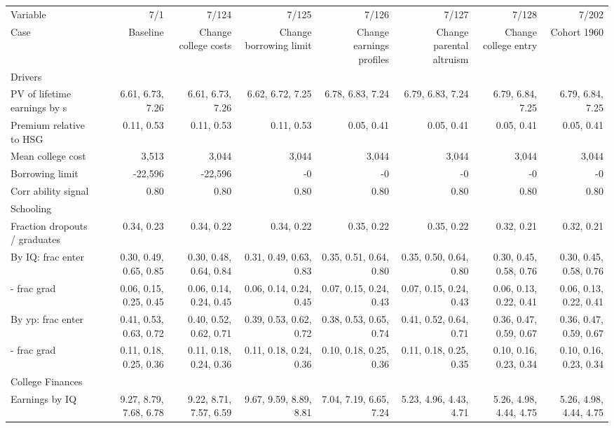 \begin{tabular}{lrrrrrrr}
\hline
Variable & 7/1  & 7/124  & 7/125  & 7/126  & 7/127  & 7/128  & 7/202  \\ 
Case & Baseline  & Change college costs  & Change borrowing limit  & Change earnings profiles  & Change parental altruism  & Change college entry  & Cohort 1960  \\ 
Drivers &   &   &   &   &   &   &   \\ 
PV of lifetime earnings by s & 6.61, 6.73, 7.26  & 6.61, 6.73, 7.26  & 6.62, 6.72, 7.25  & 6.78, 6.83, 7.24  & 6.79, 6.83, 7.24  & 6.79, 6.84, 7.25  & 6.79, 6.84, 7.25  \\ 
Premium relative to HSG & 0.11, 0.53  & 0.11, 0.53  & 0.11, 0.53  & 0.05, 0.41  & 0.05, 0.41  & 0.05, 0.41  & 0.05, 0.41  \\ 
Mean college cost & 3,513  & 3,044  & 3,044  & 3,044  & 3,044  & 3,044  & 3,044  \\ 
Borrowing limit & -22,596  & -22,596  & -0  & -0  & -0  & -0  & -0  \\ 
Corr ability signal & 0.80  & 0.80  & 0.80  & 0.80  & 0.80  & 0.80  & 0.80  \\ 
\hline
Schooling &   &   &   &   &   &   &   \\ 
Fraction dropouts / graduates & 0.34, 0.23  & 0.34, 0.22  & 0.34, 0.22  & 0.35, 0.22  & 0.35, 0.22  & 0.32, 0.21  & 0.32, 0.21  \\ 
By IQ: frac enter & 0.30, 0.49, 0.65, 0.85  & 0.30, 0.48, 0.64, 0.84  & 0.31, 0.49, 0.63, 0.83  & 0.35, 0.51, 0.64, 0.80  & 0.35, 0.50, 0.64, 0.80  & 0.30, 0.45, 0.58, 0.76  & 0.30, 0.45, 0.58, 0.76  \\ 
- frac grad & 0.06, 0.15, 0.25, 0.45  & 0.06, 0.14, 0.24, 0.45  & 0.06, 0.14, 0.24, 0.45  & 0.07, 0.15, 0.24, 0.43  & 0.07, 0.15, 0.24, 0.43  & 0.06, 0.13, 0.22, 0.41  & 0.06, 0.13, 0.22, 0.41  \\ 
By yp: frac enter & 0.41, 0.53, 0.63, 0.72  & 0.40, 0.52, 0.62, 0.71  & 0.39, 0.53, 0.62, 0.72  & 0.38, 0.53, 0.65, 0.74  & 0.41, 0.52, 0.64, 0.71  & 0.36, 0.47, 0.59, 0.67  & 0.36, 0.47, 0.59, 0.67  \\ 
- frac grad & 0.11, 0.18, 0.25, 0.36  & 0.11, 0.18, 0.24, 0.36  & 0.11, 0.18, 0.24, 0.36  & 0.10, 0.18, 0.25, 0.36  & 0.11, 0.18, 0.25, 0.35  & 0.10, 0.16, 0.23, 0.34  & 0.10, 0.16, 0.23, 0.34  \\ 
\hline
College Finances &   &   &   &   &   &   &   \\ 
Earnings by IQ & 9.27, 8.79, 7.68, 6.78  & 9.22, 8.71, 7.57, 6.59  & 9.67, 9.59, 8.89, 8.81  & 7.04, 7.19, 6.65, 7.24  & 5.23, 4.96, 4.43, 4.71  & 5.26, 4.98, 4.44, 4.75  & 5.26, 4.98, 4.44, 4.75  \\ 

\end{tabular}
